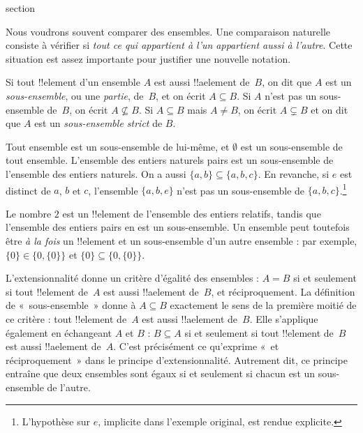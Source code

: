 \documentclass[11pt,a4paper,openany]{memoir}
\begin{document}
\endgroup



\begingroup
\expandafter\def\csname ol@sectioncs\endcsname{section}
\def\olfilename{subsets}



\begin{explain}
Nous voudrons souvent comparer des ensembles. Une comparaison
naturelle consiste à vérifier si \emph{tout ce qui appartient à
l'un appartient aussi à l'autre}. Cette situation est assez
importante pour justifier une nouvelle notation.
\end{explain}

\begin{defn}
Si tout !!{element} d'un ensemble $A$ est aussi !!a{element} de~$B$,
on dit que $A$ est un \emph{sous-ensemble}, ou une \emph{partie},
de~$B$, et on écrit $A \subseteq B$. Si $A$ n'est pas un
sous-ensemble de~$B$, on écrit $A \not\subseteq B$.
Si $A \subseteq B$ mais $A \neq B$, on écrit $A \subsetneq B$
et on dit que $A$ est un \emph{sous-ensemble strict} de $B$.
\end{defn}

\begin{ex}
Tout ensemble est un sous-ensemble de lui-même, et $\emptyset$ est
un sous-ensemble de tout ensemble. L'ensemble des entiers naturels
pairs est un sous-ensemble de l'ensemble des entiers naturels.
On a aussi $\{ a, b \} \subseteq \{ a, b, c \}$. En revanche,
si $e$ est distinct de $a$, $b$ et $c$, l'ensemble $\{ a, b, e \}$
n'est pas un sous-ensemble de $\{ a, b, c \}$.\footnote{L'hypothèse
sur $e$, implicite dans l'exemple original, est rendue explicite.}
\end{ex}

\begin{ex}
Le nombre $2$ est un !!{element} de l'ensemble des entiers relatifs,
tandis que l'ensemble des entiers pairs en est un sous-ensemble.
Un ensemble peut toutefois être \emph{à la fois} un !!{element}
et un sous-ensemble d'un autre ensemble : par exemple,
$\{0\} \in \{0, \{0\}\}$ et $\{0\} \subseteq \{0, \{0\}\}$.
\end{ex}

L'extensionnalité donne un critère d'égalité des ensembles :
$A = B$ si et seulement si tout !!{element} de~$A$ est aussi
!!a{element} de~$B$, et réciproquement. La définition de
«~sous-ensemble~» donne à $A \subseteq B$ exactement le sens de
la première moitié de ce critère : tout !!{element} de~$A$ est
aussi !!a{element} de~$B$. Elle s'applique également en échangeant
$A$ et $B$ : $B \subseteq A$ si et seulement si tout !!{element}
de~$B$ est aussi !!a{element} de~$A$. C'est précisément ce
qu'exprime «~et réciproquement~» dans le principe d'extensionnalité.
Autrement dit, ce principe entraîne que deux ensembles sont égaux
si et seulement si chacun est un sous-ensemble de l'autre.
\end{document}
